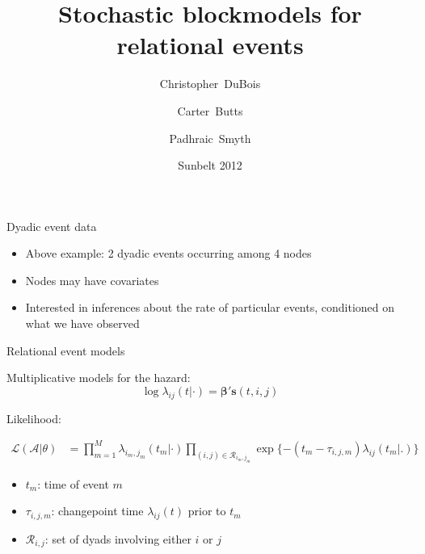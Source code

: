 \documentclass{beamer}
\title[Blockmodels for relational events]%
{Stochastic blockmodels for relational events}
\subtitle{}
\author[DuBois, Christopher] %
{Christopher~DuBois\inst{1} \and Carter~Butts\inst{2} \and Padhraic~Smyth\inst{3}}
\institute[] %
{
  \inst{1}%
Department of Statistics \\
University of California, Irvine
  \and
  \inst{2}%
Department of Sociology \\
University of California, Irvine
  \and
  \inst{2}%
Department of Computer Science \\
University of California, Irvine
}
\date[Sunbelt 2012] %
{Sunbelt 2012}
\begin{document}
\frame{\titlepage}

\begin{frame}{Dyadic event data}
\begin{figure}
{
}
\end{figure}

\begin{itemize}
\item Above example: 2 dyadic events occurring among 4 nodes
\item Nodes may have covariates
\item Interested in inferences about the rate of particular events, conditioned on what we have observed
\end{itemize}
\end{frame}

\begin{frame}{Relational event models}

Multiplicative models for the hazard:
$$\log \lambda_{ij}(t | \cdot) = \boldsymbol{\beta}' \mathbf{s}(t,i,j)$$

Likelihood:

\begin{align}
\mathcal{L}(\mathcal{A}|\theta) &= \prod_{m=1}^M \lambda_{i_m,j_m}(t_m|\cdot) \prod_{(i,j) \in \mathcal{R}_{i_m,j_m}}\exp\{ - (t_m - \tau_{i,j,m}) \lambda_{ij}(t_m | .) \}
\end{align}

\begin{itemize}
\item $t_m$: time of event $m$
\item $\tau_{i,j,m}$: changepoint time $\lambda_{ij}(t)$ prior to $t_m$
\item $\mathcal{R}_{i,j}$: set of dyads involving either $i$ or $j$
\end{itemize}

\end{frame}
\end{document}
